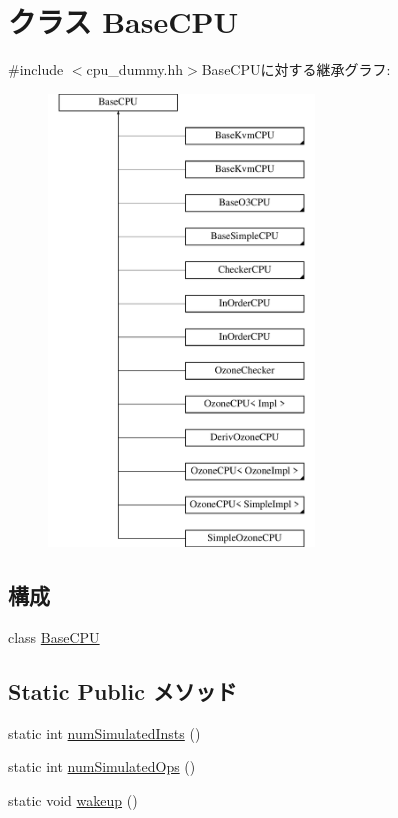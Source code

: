 \hypertarget{classBaseCPU}{
\section{クラス BaseCPU}
\label{classBaseCPU}
}


{\ttfamily \#include $<$cpu\_\-dummy.hh$>$}BaseCPUに対する継承グラフ:\begin{figure}[H]
\begin{center}
\leavevmode
\includegraphics[height=12cm]{classBaseCPU}
\end{center}
\end{figure}
\subsection*{構成}
\begin{DoxyCompactItemize}
\item 
class \hyperlink{classBaseCPU_1_1BaseCPU}{BaseCPU}
\end{DoxyCompactItemize}
\subsection*{Static Public メソッド}
\begin{DoxyCompactItemize}
\item 
static int \hyperlink{classBaseCPU_a3dc27039752f525298c687220bcf26c2}{numSimulatedInsts} ()
\item 
static int \hyperlink{classBaseCPU_a24f07c8c3ace9a4eaf5679ae790106ea}{numSimulatedOps} ()
\item 
static void \hyperlink{classBaseCPU_a75101f8aee74078c8c3c1d1f3617f7cc}{wakeup} ()
\end{DoxyCompactItemize}
